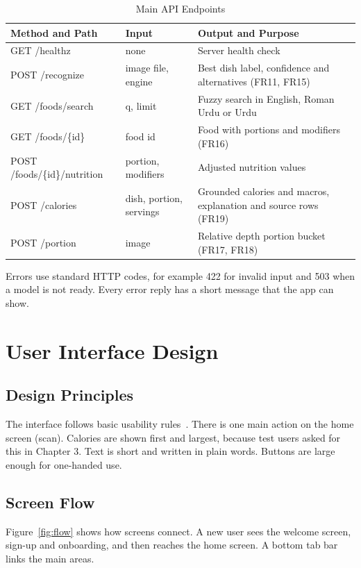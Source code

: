 \begin{table}[H]
\centering
\caption{Main API Endpoints}
\label{tab:api}
\small
\begin{tabularx}{\textwidth}{|>{\ttfamily\raggedright\arraybackslash}p{4.9cm}|>{\raggedright\arraybackslash}p{3.0cm}|>{\raggedright\arraybackslash}X|}
\hline
\textbf{Method and Path} & \textbf{Input} & \textbf{Output and Purpose} \\ \hline
GET /healthz & none & Server health check \\ \hline
POST /recognize & image file, engine & Best dish label, confidence and alternatives (FR11, FR15) \\ \hline
GET /foods/search & q, limit & Fuzzy search in English, Roman Urdu or Urdu \\ \hline
GET /foods/\{id\} & food id & Food with portions and modifiers (FR16) \\ \hline
POST /foods/\{id\}/nutrition & portion, modifiers & Adjusted nutrition values \\ \hline
POST /calories & dish, portion, servings & Grounded calories and macros, explanation and source rows (FR19) \\ \hline
POST /portion & image & Relative depth portion bucket (FR17, FR18) \\ \hline
\end{tabularx}
\end{table}

Errors use standard HTTP codes, for example 422 for invalid input and 503 when a model is not ready. Every
error reply has a short message that the app can show.

\section{User Interface Design}
\subsection{Design Principles}
The interface follows basic usability rules~\cite{custom_technique_1(0),user_interface}. There is one main action
on the home screen (scan). Calories are shown first and largest, because test users asked for this in
Chapter 3. Text is short and written in plain words. Buttons are large enough for one-handed use.

\subsection{Screen Flow}
Figure~\ref{fig:flow} shows how screens connect. A new user sees the welcome screen, sign-up and
onboarding, and then reaches the home screen. A bottom tab bar links the main areas.

